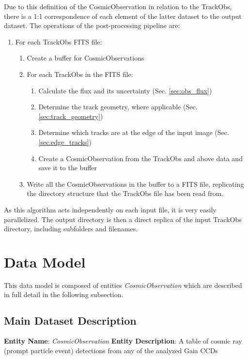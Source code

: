 \documentclass[a4paper, 11pt]{article}
\begin{document}
Due to this definition of the CosmicObservation in relation to the TrackObs, there is a 1:1 correspondence of each element of the latter dataset to the output dataset. The operations of the post-processing pipeline are:

\begin{enumerate}
  \item For each TrackObs FITS file:
    \begin{enumerate}
      \item Create a buffer for CosmicObservations
      \item For each TrackObs in the FITS file:
        \begin{enumerate}
          \item Calculate the flux and its uncertainty (Sec. \ref{sec:obs_flux})
          \item Determine the track geometry, where applicable (Sec. \ref{sec:track_geometry})
          \item Determine which tracks are at the edge of the input image (Sec. \ref{sec:edge_tracks})
          \item Create a CosmicObservation from the TrackObs and above data and save it to the buffer
        \end{enumerate}
      \item Write all the CosmicObservations in the buffer to a FITS file, replicating the directory structure that the TrackObs file has been read from.
    \end{enumerate}
\end{enumerate}

As this algorithm acts independently on each input file, it is very easily parallelized. The output directory is then a direct replica of the input TrackObs directory, including subfolders and filenames.

\section{Data Model}
\label{sec:datamodel}

This data model is composed of entities {\it CosmicObservation} which are described in full detail in the following subsection.

\subsection{Main Dataset Description}
\label{sec:CosObsModel}

\textbf{Entity Name}:  \textit{CosmicObservation}
\newline
\newline
\textbf{Entity Description}:  A table of cosmic ray (prompt particle event) detections from any of the analyzed Gaia CCDs 
\newline
\newline
\end{document}
